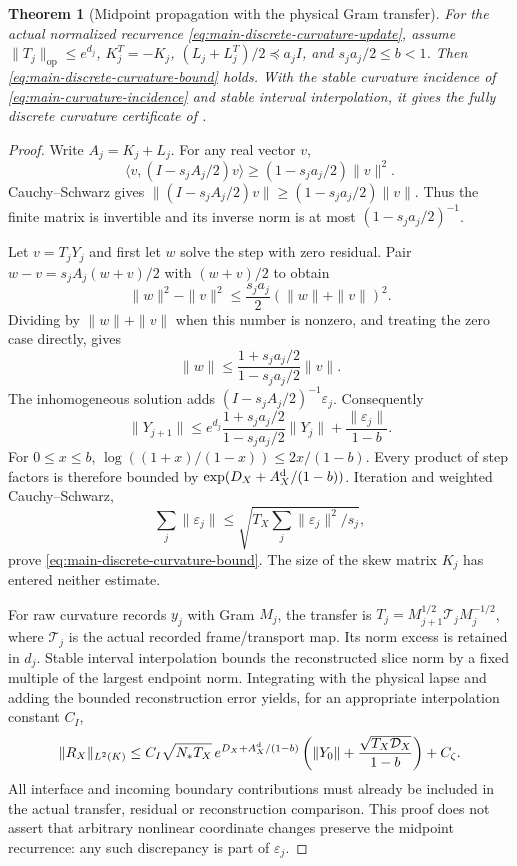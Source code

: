 \documentclass[11pt]{article}
\newtheorem{theorem}{Theorem}[section]
\theoremstyle{definition}
\theoremstyle{remark}
\newcommand{\op}{\mathrm{op}}
\begin{document}
\begin{theorem}[Midpoint propagation with the physical Gram transfer]
\label{thm:supp-discrete-curvature}
For the actual normalized recurrence
\eqref{eq:main-discrete-curvature-update}, assume
$\|T_j\|_{\op}\le e^{d_j}$, $K_j^T=-K_j$,
$(L_j+L_j^T)/2\preceq a_jI$, and $s_ja_j/2\le b<1$.
Then \eqref{eq:main-discrete-curvature-bound} holds.  With the stable
curvature incidence of \eqref{eq:main-curvature-incidence} and stable interval
interpolation, it gives the fully discrete curvature certificate of
.
\end{theorem}
\begin{proof}
Write $A_j=K_j+L_j$.  For any real vector $v$,
\[
 \langle v,(I-s_jA_j/2)v\rangle
       \ge(1-s_ja_j/2)\|v\|^2.
\]
Cauchy--Schwarz gives
$\|(I-s_jA_j/2)v\|\ge(1-s_ja_j/2)\|v\|$.  Thus the finite matrix is
invertible and its inverse norm is at most $(1-s_ja_j/2)^{-1}$.

Let $v=T_jY_j$ and first let $w$ solve the step with zero residual.  Pair
$w-v=s_jA_j(w+v)/2$ with $(w+v)/2$ to obtain
\[
 \|w\|^2-\|v\|^2
 \le\frac{s_ja_j}{2}(\|w\|+\|v\|)^2.
\]
Dividing by $\|w\|+\|v\|$ when this number is nonzero, and treating the
zero case directly, gives
\[
 \|w\|\le\frac{1+s_ja_j/2}{1-s_ja_j/2}\|v\|.
\]
The inhomogeneous solution adds
$(I-s_jA_j/2)^{-1}\varepsilon_j$.  Consequently
\[
 \|Y_{j+1}\|\le e^{d_j}
       \frac{1+s_ja_j/2}{1-s_ja_j/2}\|Y_j\|
       +\frac{\|\varepsilon_j\|}{1-b}.
\]
For $0\le x\le b$,
$\log((1+x)/(1-x))\le2x/(1-b)$.  Every product of step factors is
therefore bounded by $\exp(D_X+A_X^{\rm d}/(1-b))$.
Iteration and weighted Cauchy--Schwarz,
\[
 \sum_j\|\varepsilon_j\|
       \le\sqrt{T_X\sum_j\|\varepsilon_j\|^2/s_j},
\]
prove \eqref{eq:main-discrete-curvature-bound}.  The size of the skew matrix
$K_j$ has entered neither estimate.

For raw curvature records $y_j$ with Gram $M_j$, the transfer is
$T_j=M_{j+1}^{1/2}\mathcal T_jM_j^{-1/2}$, where $\mathcal T_j$ is the
actual recorded frame/transport map.  Its norm excess is retained in $d_j$.
Stable interval interpolation bounds the reconstructed slice norm by a fixed
multiple of the largest endpoint norm.  Integrating with the physical lapse
and adding the bounded reconstruction error yields, for an appropriate
interpolation constant $C_I$,
\[
 \|R_X\|_{L^2(K)}
 \le C_I\sqrt{N_*T_X}\,e^{D_X+A_X^{\rm d}/(1-b)}
       \left(\|Y_0\|+\frac{\sqrt{T_X\mathcal D_X}}{1-b}\right)+C_\zeta.
\]
All interface and incoming boundary contributions must already be included
in the actual transfer, residual or reconstruction comparison.  This proof
does not assert that arbitrary nonlinear coordinate changes preserve the
midpoint recurrence: any such discrepancy is part of $\varepsilon_j$.
\end{proof}
\end{document}
